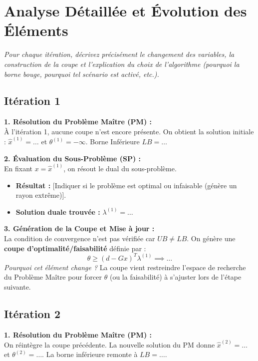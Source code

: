 \documentclass[11pt,a4paper]{article}
\begin{document}
\pagebreak %

\section{Analyse Détaillée et Évolution des Éléments}
\label{sec:analyse_detaillee}
\textit{Pour chaque itération, décrivez précisément le changement des variables, la construction de la coupe et l'explication du choix de l'algorithme (pourquoi la borne bouge, pourquoi tel scénario est activé, etc.).}

\subsection{Itération 1}
\textbf{1. Résolution du Problème Maître (PM) :} \\
À l'itération 1, aucune coupe n'est encore présente. On obtient la solution initiale :
$\hat{x}^{(1)} = \dots$ et $\theta^{(1)} = -\infty$. Borne Inférieure $LB = \dots$

\noindent \textbf{2. Évaluation du Sous-Problème (SP) :} \\
En fixant $x = \hat{x}^{(1)}$, on résout le dual du sous-problème. 
\begin{itemize}
    \item \textbf{Résultat :} [Indiquer si le problème est optimal ou infaisable (génère un rayon extrême)].
    \item \textbf{Solution duale trouvée :} $\lambda^{(1)} = \dots$
\end{itemize}

\noindent \textbf{3. Génération de la Coupe et Mise à jour :} \\
La condition de convergence n'est pas vérifiée car $UB \neq LB$. On génère une \textbf{coupe d'optimalité/faisabilité} définie par :
\begin{equation*}
    \theta \ge (d - Gx)^T \lambda^{(1)} \implies \dots
\end{equation*}
\textit{Pourquoi cet élément change ?} La coupe vient restreindre l'espace de recherche du Problème Maître pour forcer $\theta$ (ou la faisabilité) à s'ajuster lors de l'étape suivante.

\subsection{Itération 2}
\textbf{1. Résolution du Problème Maître (PM) :} \\
On réintègre la coupe précédente. La nouvelle solution du PM donne $\hat{x}^{(2)} = \dots$ et $\theta^{(2)} = \dots$. La borne inférieure remonte à $LB = \dots$.
\end{document}
